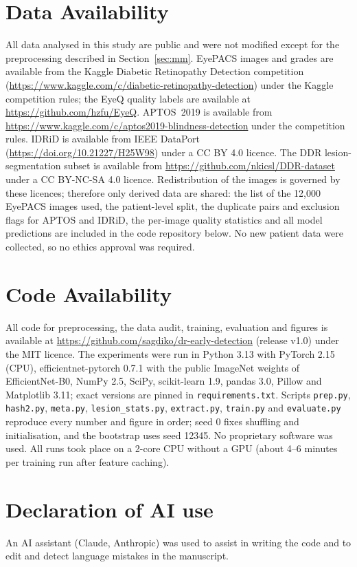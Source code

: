 \documentclass[11pt,a4paper]{article}
\begin{document}
\section*{Data Availability}
All data analysed in this study are public and were not modified except for the preprocessing described in Section~\ref{sec:mm}. EyePACS images and grades are available from the Kaggle Diabetic Retinopathy Detection competition (\url{https://www.kaggle.com/c/diabetic-retinopathy-detection}) under the Kaggle competition rules; the EyeQ quality labels are available at \url{https://github.com/hzfu/EyeQ}. APTOS~2019 is available from \url{https://www.kaggle.com/c/aptos2019-blindness-detection} under the competition rules. IDRiD is available from IEEE DataPort (\url{https://doi.org/10.21227/H25W98}) under a CC BY 4.0 licence. The DDR lesion-segmentation subset is available from \url{https://github.com/nkicsl/DDR-dataset} under a CC BY-NC-SA 4.0 licence. Redistribution of the images is governed by these licences; therefore only derived data are shared: the list of the 12{,}000 EyePACS images used, the patient-level split, the duplicate pairs and exclusion flags for APTOS and IDRiD, the per-image quality statistics and all model predictions are included in the code repository below. No new patient data were collected, so no ethics approval was required.

\section*{Code Availability}
All code for preprocessing, the data audit, training, evaluation and figures is available at \url{https://github.com/sagdiko/dr-early-detection} (release v1.0) under the MIT licence. The experiments were run in Python 3.13 with PyTorch 2.15 (CPU), efficientnet-pytorch 0.7.1 with the public ImageNet weights of EfficientNet-B0, NumPy 2.5, SciPy, scikit-learn 1.9, pandas 3.0, Pillow and Matplotlib 3.11; exact versions are pinned in \texttt{requirements.txt}. Scripts \texttt{prep.py}, \texttt{hash2.py}, \texttt{meta.py}, \texttt{lesion\_stats.py}, \texttt{extract.py}, \texttt{train.py} and \texttt{evaluate.py} reproduce every number and figure in order; seed 0 fixes shuffling and initialisation, and the bootstrap uses seed 12345. No proprietary software was used. All runs took place on a 2-core CPU without a GPU (about 4--6 minutes per training run after feature caching).

\section*{Declaration of AI use}
An AI assistant (Claude, Anthropic) was used to assist in writing the code and to edit and detect language mistakes in the manuscript.
\end{document}
